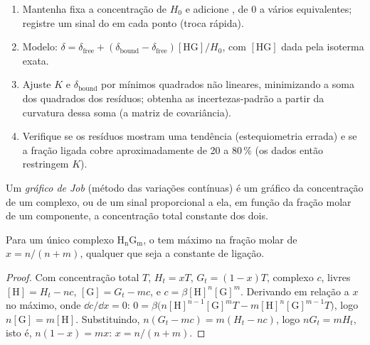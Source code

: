 \begin{method}\label{met:b3:supramolecular:nmr-titration}
\begin{enumerate}
  \item Mantenha fixa a concentração de  $H_0$ e adicione , de 0 a vários
        equivalentes; registre um sinal do  em cada ponto (troca rápida).
  \item Modelo: $\delta = \delta_{\mathrm{free}} + (\delta_{\mathrm{bound}} - \delta_{\mathrm{free}})[\mathrm{HG}]/H_0$, com $[\mathrm{HG}]$ dada pela isoterma exata.
  \item Ajuste $K$ e $\delta_{\mathrm{bound}}$ por mínimos quadrados não lineares, minimizando a soma dos quadrados dos
        resíduos; obtenha as incertezas-padrão a partir da curvatura dessa soma
        (a matriz de covariância).
  \item Verifique se os resíduos mostram uma tendência (estequiometria errada) e se a
        fração ligada cobre aproximadamente de 20 a 80\,\% (os dados então restringem $K$).
\end{enumerate}
\end{method}

\begin{definition}\label{def:b3:supramolecular:job}
Um \emph{gráfico de Job} (método das variações contínuas) é um gráfico da
concentração de um complexo, ou de um sinal proporcional a ela, em função da
fração molar de um componente, a concentração total constante dos
dois.
\end{definition}

\begin{proposition}\label{prop:b3:supramolecular:job}
Para um único complexo $\mathrm{H_nG_m}$, o  tem máximo na fração molar de 
$x = n/(n + m)$, qualquer que seja a constante de ligação.
\end{proposition}

\begin{proof}
Com concentração total $T$, $H_t = xT$, $G_t = (1 - x)T$, complexo $c$, livres $[\mathrm H] = H_t - nc$,
$[\mathrm G] = G_t - mc$, e $c = \beta[\mathrm H]^n[\mathrm G]^m$. Derivando em relação a $x$ no máximo, onde
$\dd c/\dd x = 0$: $0 = \beta\bigl(n[\mathrm H]^{n-1}[\mathrm G]^m T - m[\mathrm H]^n[\mathrm G]^{m-1}T\bigr)$, logo $n[\mathrm G] = m[\mathrm H]$. Substituindo,
$n(G_t - mc) = m(H_t - nc)$, logo $nG_t = mH_t$, isto é, $n(1 - x) = mx$: $x = n/(n + m)$.
\end{proof}

